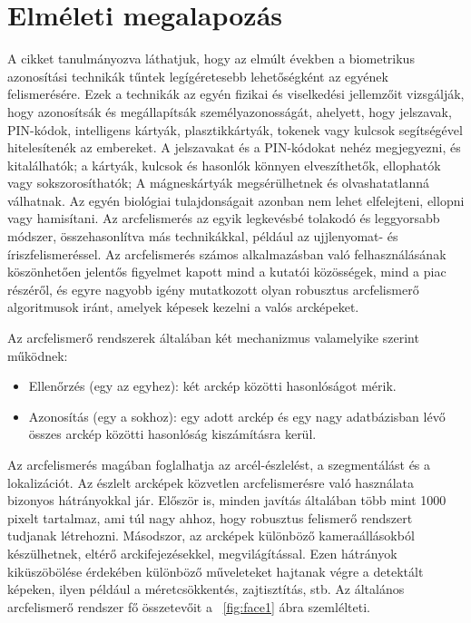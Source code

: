 \chapter{Elméleti megalapozás} \label{chapter5}
A \cite{9} cikket tanulmányozva láthatjuk, hogy az elmúlt években a biometrikus azonosítási technikák tűntek legígéretesebb lehetőségként az egyének felismerésére. Ezek a technikák az egyén fizikai és viselkedési jellemzőit vizsgálják, hogy azonosítsák és megállapítsák személyazonosságát, ahelyett, hogy jelszavak, PIN-kódok, intelligens kártyák, plasztikkártyák, tokenek vagy kulcsok segítségével hitelesítenék az embereket. A jelszavakat és a PIN-kódokat nehéz megjegyezni, és kitalálhatók; a kártyák, kulcsok és hasonlók könnyen elveszíthetők, ellophatók vagy sokszorosíthatók; A mágneskártyák megsérülhetnek és olvashatatlanná válhatnak. Az egyén biológiai tulajdonságait azonban nem lehet elfelejteni, ellopni vagy hamisítani. \cite{10}
Az arcfelismerés az egyik legkevésbé tolakodó és leggyorsabb módszer, összehasonlítva más technikákkal, például az ujjlenyomat- és íriszfelismeréssel.
Az arcfelismerés számos alkalmazásban való felhasználásának köszönhetően jelentős figyelmet kapott mind a kutatói közösségek, mind a piac részéről, és egyre nagyobb igény mutatkozott olyan robusztus arcfelismerő algoritmusok iránt, amelyek képesek kezelni a valós arcképeket.

Az arcfelismerő rendszerek általában két mechanizmus valamelyike szerint működnek: 

\begin{itemize}
    \item Ellenőrzés (egy az egyhez): két arckép közötti hasonlóságot mérik.
    \item Azonosítás (egy a sokhoz): egy adott arckép és egy nagy adatbázisban lévő összes arckép közötti hasonlóság kiszámításra kerül.
\end{itemize}

Az arcfelismerés magában foglalhatja az arcél-észlelést, a szegmentálást és a lokalizációt.
Az észlelt arcképek közvetlen arcfelismerésre való használata bizonyos hátrányokkal jár. Először is, minden javítás általában több mint 1000 pixelt tartalmaz, ami túl nagy ahhoz, hogy robusztus felismerő rendszert tudjanak létrehozni. Másodszor, az arcképek különböző kameraállásokból készülhetnek, eltérő arckifejezésekkel, megvilágítással. Ezen hátrányok kiküszöbölése érdekében különböző műveleteket hajtanak végre a detektált képeken, ilyen például a méretcsökkentés, zajtisztítás, stb.
\newpage
Az általános arcfelismerő rendszer fő összetevőit a ~\ref{fig:face1} ábra szemlélteti.

